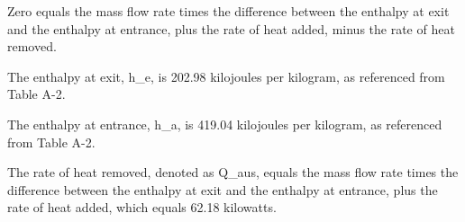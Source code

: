 Zero equals the mass flow rate times the difference between the enthalpy at exit and the enthalpy at entrance, plus the rate of heat added, minus the rate of heat removed.

The enthalpy at exit, h_e, is 202.98 kilojoules per kilogram, as referenced from Table A-2.

The enthalpy at entrance, h_a, is 419.04 kilojoules per kilogram, as referenced from Table A-2.

The rate of heat removed, denoted as Q_aus, equals the mass flow rate times the difference between the enthalpy at exit and the enthalpy at entrance, plus the rate of heat added, which equals 62.18 kilowatts.
